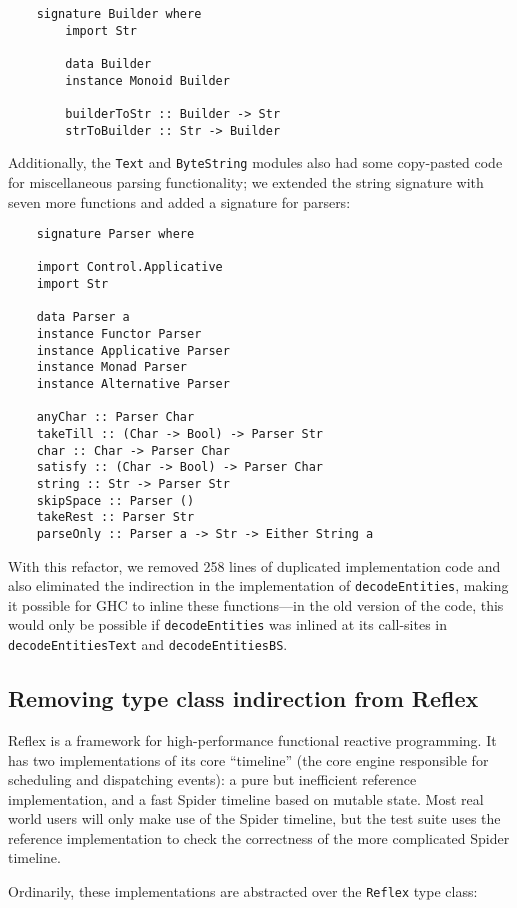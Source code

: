 \begin{lstlisting}
    signature Builder where
        import Str

        data Builder
        instance Monoid Builder

        builderToStr :: Builder -> Str
        strToBuilder :: Str -> Builder
\end{lstlisting}
%
Additionally, the \verb|Text| and \verb|ByteString|
modules also had some copy-pasted code for miscellaneous parsing
functionality; we extended the string signature with seven more
functions and added a signature for parsers:

\begin{lstlisting}
    signature Parser where

    import Control.Applicative
    import Str

    data Parser a
    instance Functor Parser
    instance Applicative Parser
    instance Monad Parser
    instance Alternative Parser

    anyChar :: Parser Char
    takeTill :: (Char -> Bool) -> Parser Str
    char :: Char -> Parser Char
    satisfy :: (Char -> Bool) -> Parser Char
    string :: Str -> Parser Str
    skipSpace :: Parser ()
    takeRest :: Parser Str
    parseOnly :: Parser a -> Str -> Either String a
\end{lstlisting}
%
With this refactor, we removed 258 lines of duplicated implementation
code and also eliminated the indirection in the implementation
of \verb|decodeEntities|, making it possible for GHC to inline
these functions---in the old version of the code, this would only
be possible if \verb|decodeEntities| was inlined at its call-sites
in \verb|decodeEntitiesText| and \verb|decodeEntitiesBS|.

\subsection{Removing type class indirection from Reflex}

Reflex is a framework for high-performance functional reactive
programming.  It has two implementations of its core ``timeline'' (the core
engine responsible for scheduling and dispatching events):
a pure but inefficient reference implementation, and a fast
Spider timeline based on mutable state.  Most real world users
will only make use of the Spider timeline, but the test suite
uses the reference implementation to check the correctness of the
more complicated Spider timeline.

Ordinarily, these implementations are abstracted over the \verb|Reflex|
type class:

